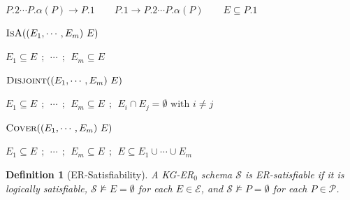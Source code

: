 \documentclass[10pt]{article}
\newtheorem*{definition}{Definition}
\begin{document}
$
P.2 \cdots P.\alpha(P)\rightarrow P.1
\qquad
P.1\rightarrow P.2\cdots P.\alpha(P)
\qquad
E\subseteq P.1 
$

\noindent
$\textsc{IsA}((E_1,\cdots,E_m)\ E)$

$E_1\subseteq E ~~;~~\cdots ~~;~~E_m\subseteq E$

\noindent
$\textsc{Disjoint}((E_1,\cdots,E_m)\ E)$ 
 
$E_1\subseteq E ~~;~~\cdots ~~;~~E_m\subseteq E ~~;~~
E_i\cap E_j=\emptyset \text{ with } i\neq j$

\noindent
$\textsc{Cover}((E_1,\cdots,E_m)\ E)$

$E_1\subseteq E ~~;~~\cdots ~~;~~E_m\subseteq E ~~;~~
E\subseteq E_1 \cup\cdots\cup E_m$

\begin{definition}[ER-Satisfiability]
A KG-ER$_0$ schema \(\mathcal S\) is \emph{ER-satisfiable} if it is
logically satisfiable, \(\mathcal S\not\models E=\emptyset\) for each
\(E\in\mathcal E\), and \(\mathcal S\not\models P=\emptyset\) for each
\(P\in\mathcal P\).
\end{definition}
\end{document}
